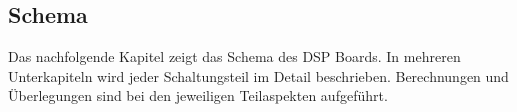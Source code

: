 \subsection{Schema}
\label{sec:Schema}

Das nachfolgende Kapitel zeigt das Schema des DSP Boards. 
In mehreren Unterkapiteln wird jeder Schaltungsteil im Detail beschrieben.
Berechnungen und Überlegungen sind bei den jeweiligen Teilaspekten aufgeführt.


